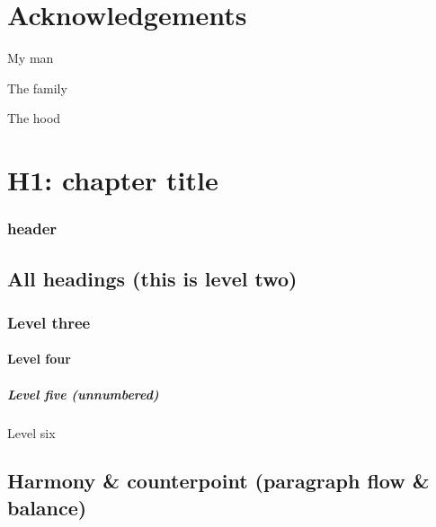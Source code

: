 \documentclass[
]{tufte-pandoc}
\begin{document}
\hypertarget{acknowledgements}{%
\section*{Acknowledgements}\label{acknowledgements}}

My man

The family

The hood

\hypertarget{h1-chapter-title}{%
\section{H1: chapter title}\label{h1-chapter-title}}

\hypertarget{header}{%
\subsubsection*{header}\label{header}}

\hypertarget{all-headings-this-is-level-two}{%
\subsection{All headings (this is level
two)}\label{all-headings-this-is-level-two}}

\hypertarget{level-three}{%
\subsubsection{Level three}\label{level-three}}

\hypertarget{level-four}{%
\paragraph{Level four}\label{level-four}}

\hypertarget{level-five-unnumbered}{%
\subparagraph*{Level five (unnumbered)}\label{level-five-unnumbered}}

Level six

\hypertarget{harmony-counterpoint-paragraph-flow-balance}{%
\subsection{Harmony \& counterpoint (paragraph flow \&
balance)}\label{harmony-counterpoint-paragraph-flow-balance}}
\end{document}

